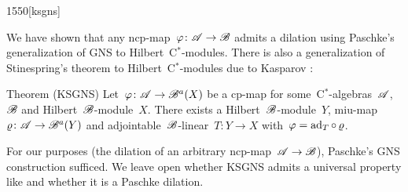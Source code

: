 \begin{parsec}{1550}[ksgns]%
\begin{point}{10}%
We have shown that any ncp-map~$\varphi\colon \mathscr{A} \to \mathscr{B}$
    admits a dilation using Paschke's generalization of GNS
    to Hilbert~C$^*$-modules.
There is also a generalization of Stinespring's theorem
    to Hilbert~C$^*$-modules
    due to Kasparov \cite{ksgns}:
\end{point}
\begin{point}{20}{Theorem (KSGNS)}%
Let~$\varphi\colon \mathscr{A} \to \mathscr{B}^a(X)$
    be a cp-map
    for some~C$^*$-algebras~$\mathscr{A}$, $\mathscr{B}$
    and Hilbert~$\mathscr{B}$-module~$X$.
There exists a Hilbert~$\mathscr{B}$-module~$Y$,
    miu-map~$\varrho\colon \mathscr{A} \to \mathscr{B}^a(Y)$
    and adjointable~$\mathscr{B}$-linear~$T\colon Y\to X$
    with~$\varphi = \mathrm{ad}_T \mathop{\circ} \varrho$.
\end{point}
\begin{point}{30}%
For our purposes (the dilation of an arbitrary ncp-map~$\mathscr{A} \to \mathscr{B}$),
    Paschke's GNS construction sufficed.
We leave open whether
    KSGNS admits a universal property like 
    and whether it is a Paschke dilation.
\end{point}
\end{parsec}
